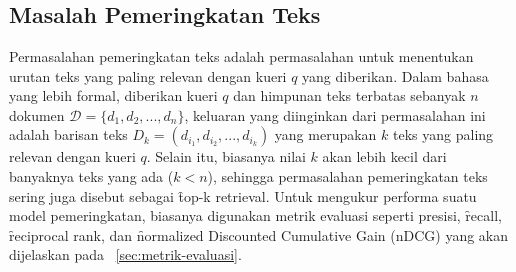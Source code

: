 \chapter{\babDua}
\label{bab:2}


\section{Masalah Pemeringkatan Teks}
    Permasalahan pemeringkatan teks adalah permasalahan untuk menentukan urutan teks yang paling relevan dengan kueri $q$ yang diberikan. Dalam bahasa yang lebih formal, diberikan kueri $q$ dan himpunan teks terbatas sebanyak $n$ dokumen  $\mathcal{D}= \{d_1, d_2, ..., d_n\}$, keluaran yang diinginkan dari permasalahan ini adalah barisan teks $D_k = (d_{i_1}, d_{i_2}, ..., d_{i_k})$ yang merupakan $k$ teks yang paling relevan dengan kueri $q$. Selain itu, biasanya nilai $k$ akan lebih kecil dari banyaknya teks yang ada ($k<n$), sehingga permasalahan pemeringkatan teks sering juga disebut sebagai \f{top-k retrieval}. Untuk mengukur performa suatu model pemeringkatan, biasanya digunakan metrik evaluasi seperti presisi, \f{recall}, \f{reciprocal rank}, dan \f{normalized Discounted Cumulative Gain} (nDCG) yang akan dijelaskan pada \sect~\ref{sec:metrik-evaluasi}.

